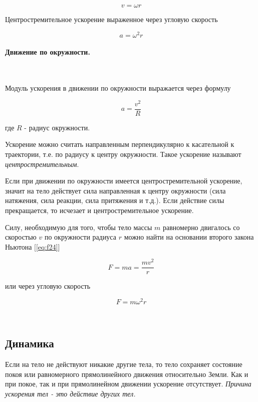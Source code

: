 \documentclass[a4paper,12pt]{article}
\begin{document}
		\begin{equation}
			v = \omega r
		\end{equation}

		Центростремительное ускорение выраженное  через угловую скорость

		\begin{equation}
			a = \omega^2 r
		\end{equation}

		
		\paragraph{Движение по окружности.} \
		
		Модуль ускорения в движении по окружности выражается через формулу

		\begin{equation}
			a = \frac{v^2}{R} 
		\end{equation}

		где $R$ - радиус окружности.

		Ускорение можно считать направленным перпендикулярно к касательной к траектории,
		т.е. по радиусу к центру окружности. Такое ускорение называют 
		\textit{центростремительным}.

		Если при движении по окружности имеется центростремительной ускорение, значит на 
		тело действует сила направленная к центру окружности (сила натяжения, сила реакции, 
		сила притяжения и т.д.). Если действие силы прекращается, то исчезает и центростремительное
		ускорение.

		Силу, необходимую для того, чтобы тело массы $m$ равномерно двигалось со скоростью
		$v$ по окружности радиуса $r$ можно найти на основании второго закона Ньютона 
		[\ref{eq:f24}]

		\begin{equation}
			F = ma = \frac{mv^2}{r}
		\end{equation}

		или через угловую скорость

		\begin{equation}
			F = m \omega^2 r
		\end{equation}



		\

		\subsection*{Динамика}

		Если на тело не действуют никакие другие тела, то тело сохраняет
		состояние покоя или равномерного прямолинейного движения относительно
		Земли. Как и при покое, так и при прямолинейном движении ускорение
		отсутствует. \textit{Причина ускорения тел - это действие других тел.}
		
\end{document}
